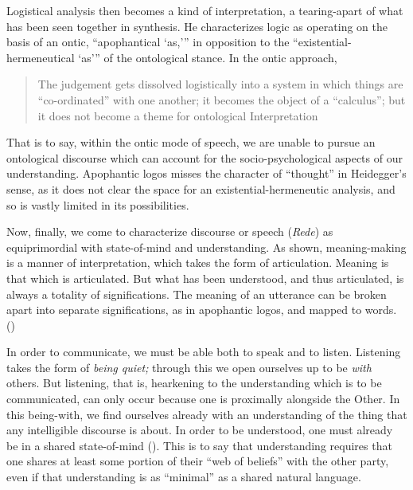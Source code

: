 \documentclass[leqno, 12pt]{turabian-researchpaper}
\begin{document}
	Logistical analysis then becomes a kind of interpretation, a tearing-apart of
	what has been seen together in synthesis. He characterizes logic as operating on
	the basis of an ontic, \enquote{apophantical \enquote{as,}} in opposition to the
	\enquote{existential-hermeneutical \enquote{as}} of the ontological stance. In
	the ontic approach, \blockquote[{}]{The judgement gets dissolved logistically into a system in which things are \enquote{co-ordinated} with one another; it becomes the object of a \enquote{calculus}; but it does not become a theme for ontological Interpretation}.
	That is to say, within the ontic mode of speech, we are unable to pursue an ontological
	discourse which can account for the socio-psychological aspects of our understanding.
	Apophantic logos misses the character of \enquote{thought} in Heidegger's sense,
	as it does not clear the space for an existential-hermeneutic analysis, and so
	is vastly limited in its possibilities.

	Now, finally, we come to characterize discourse or speech (\textit{Rede}) as
	equiprimordial with state-of-mind and understanding. As shown, meaning-making
	is a manner of interpretation, which takes the form of articulation. Meaning
	is that which is articulated. But what has been understood, and thus
	articulated, is always a totality of significations. The meaning of an
	utterance can be broken apart into separate significations, as in apophantic logos,
	and mapped to words. ()

	In order to communicate, we must be able both to speak and to listen.
	Listening takes the form of \emph{being quiet;} through this we open ourselves
	up to be \emph{with} others. But listening, that is, hearkening to the understanding
	which is to be communicated, can only occur because one is proximally
	alongside the Other. In this being-with, we find ourselves already with an
	understanding of the thing that any intelligible discourse is about. In order to
	be understood, one must already be in a shared state-of-mind ().
	This is to say that understanding requires that one shares at least some portion
	of their \enquote{web of beliefs} with the other party, even if that understanding
	is as \enquote{minimal} as a shared natural language.
\end{document}
